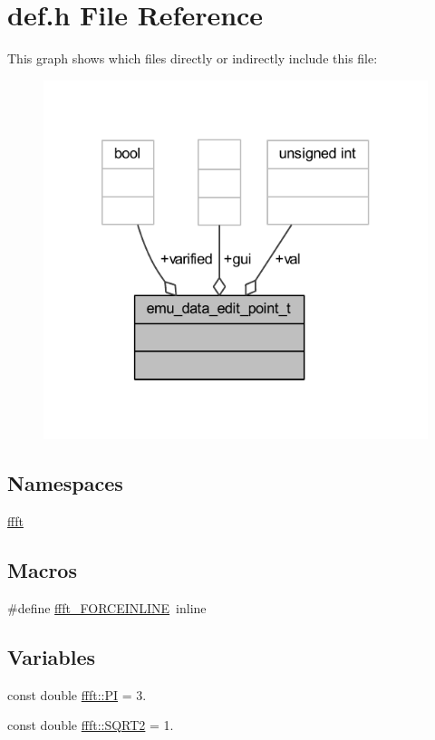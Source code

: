 \hypertarget{a00089}{\section{def.\+h File Reference}
\label{a00089}
}
This graph shows which files directly or indirectly include this file\+:
\nopagebreak
\begin{figure}[H]
\begin{center}
\leavevmode
\includegraphics[width=350pt]{d4/d9a/a00246}
\end{center}
\end{figure}
\subsection*{Namespaces}
\begin{DoxyCompactItemize}
\item 
 \hyperlink{a00142}{ffft}
\end{DoxyCompactItemize}
\subsection*{Macros}
\begin{DoxyCompactItemize}
\item 
\#define \hyperlink{a00089_a31b2ada863c9efa7455efae4e13661f3}{ffft\+\_\+\+F\+O\+R\+C\+E\+I\+N\+L\+I\+N\+E}~inline
\end{DoxyCompactItemize}
\subsection*{Variables}
\begin{DoxyCompactItemize}
\item 
const double \hyperlink{a00142_a74ffcd4c90202b5240bbca7374dfd6fa}{ffft\+::\+P\+I} = 3.
\item 
const double \hyperlink{a00142_a489004390ad7d791bf53a724c0f07abb}{ffft\+::\+S\+Q\+R\+T2} = 1.
\end{DoxyCompactItemize}


